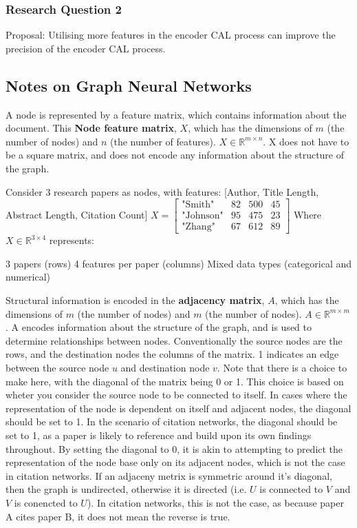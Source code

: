 \documentclass[../main.tex]{subfiles}
\begin{document}
    \subsubsection{Research Question 2}

    Proposal: Utilising more features in the encoder CAL process can improve the precision of the encoder CAL process.

    \newpage
    
    \subsection{Notes on Graph Neural Networks}


  A node is represented by a feature matrix, which contains information about the document. This \textbf{Node feature matrix}, $X$, which has the dimensions of $m$ (the number of nodes) and $n$ (the number of features). $X \in \mathbb{R}^{m \times n}$. X does not have to be a square matrix, and does not encode any information about the structure of the graph. 

  Consider 3 research papers as nodes, with features: [Author, Title Length, Abstract Length, Citation Count]
  $X = \begin{bmatrix}
  \text{"Smith"} & 82 & 500 & 45 \\
  \text{"Johnson"} & 95 & 475 & 23 \\
  \text{"Zhang"} & 67 & 612 & 89
  \end{bmatrix}$
  Where $X \in \mathbb{R}^{3 \times 4}$ represents:
  
  3 papers (rows)
  4 features per paper (columns)
  Mixed data types (categorical and numerical)

  Structural information is encoded in the \textbf{adjacency matrix}, $A$, which has the dimensions of $m$ (the number of nodes) and $m$ (the number of nodes). $A \in \mathbb{R}^{m \times m}$. A encodes information about the structure of the graph, and is used to determine relationships between nodes. Conventionally the source nodes are the rows, and the destination nodes the columns of the matrix. 1 indicates an edge between the source node $u$ and destination node $v$. Note that there is a choice to make here, with the diagonal of the matrix being 0 or 1. This choice is based on wheter you consider the source node to be connected to itself. In cases where the representation of the node is dependent on itself and adjacent nodes, the diagonal should be set to 1. In the scenario of citation networks, the diagonal should be set to 1, as a paper is likely to reference and build upon its own findings throughout. By setting the diagonal to 0, it is akin to attempting to predict the representation of the node base only on its adjacent nodes, which is not the case in citation networks. If an adjaceny metrix is symmetric around it's diagonal, then the graph is undirected, otherwise it is directed (i.e. $U$ is connected to $V$ and $V$ is conencted to $U$). In citation networks, this is not the case, as because paper A cites paper B, it does not mean the reverse is true.    
\end{document}
